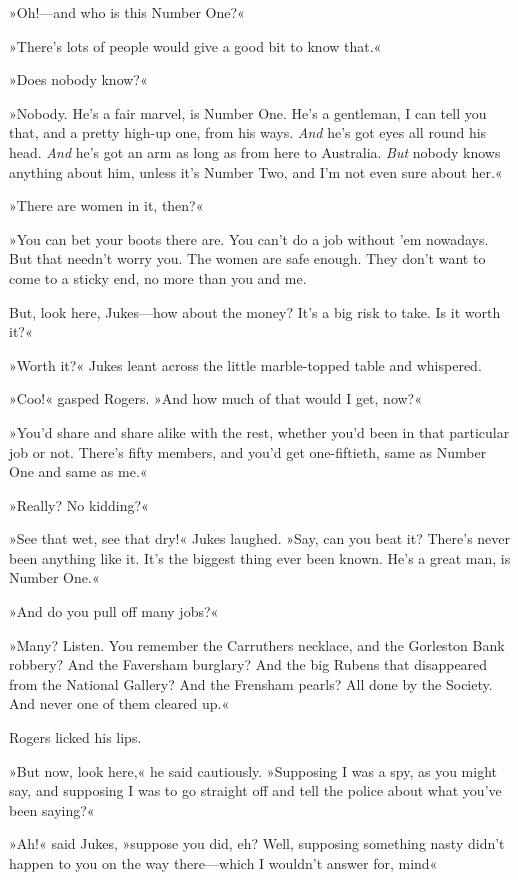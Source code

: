 »Oh!—and who is this Number One?«

»There's lots of people would give a good bit to know that.«

»Does nobody know?«

»Nobody. He's a fair marvel, is Number One. He's a gentleman, I can tell you that, and a pretty high-up one, from his ways. \textit{And} he's got eyes all round his head. \textit{And} he's got an arm as long as from here to Australia. \textit{But} nobody knows anything about him, unless it's Number Two, and I'm not even sure about her.«

»There are women in it, then?«

»You can bet your boots there are. You can't do a job without 'em nowadays. But that needn't worry you. The women are safe enough. They don't want to come to a sticky end, no more than you and me.

But, look here, Jukes—how about the money? It's a big risk to take. Is it worth it?«

»Worth it?« Jukes leant across the little marble-topped table and whispered.

»Coo!« gasped Rogers. »And how much of that would I get, now?«

»You'd share and share alike with the rest, whether you'd been in that particular job or not. There's fifty members, and you'd get one-fiftieth, same as Number One and same as me.«

»Really? No kidding?«

»See that wet, see that dry!« Jukes laughed. »Say, can you beat it? There's never been anything like it. It's the biggest thing ever been known. He's a great man, is Number One.«

»And do you pull off many jobs?«

»Many? Listen. You remember the Carruthers necklace, and the Gorleston Bank robbery? And the Faversham burglary? And the big Rubens that disappeared from the National Gallery? And the Frensham pearls? All done by the Society. And never one of them cleared up.«

Rogers licked his lips.

»But now, look here,« he said cautiously. »Supposing I was a spy, as you might say, and supposing I was to go straight off and tell the police about what you've been saying?«

»Ah!« said Jukes, »suppose you did, eh? Well, supposing something nasty didn't happen to you on the way there—which I wouldn't answer for, mind\longdash«


